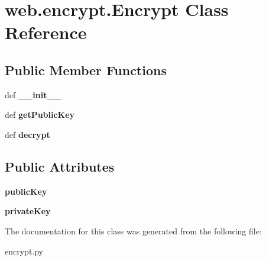 \hypertarget{classweb_1_1encrypt_1_1_encrypt}{\section{web.\-encrypt.\-Encrypt Class Reference}
\label{classweb_1_1encrypt_1_1_encrypt}
}
\subsection*{Public Member Functions}
\begin{DoxyCompactItemize}
\item 
\hypertarget{classweb_1_1encrypt_1_1_encrypt_a7ac013ef450d16011e76b7af95c25f3d}{def {\bfseries \-\_\-\-\_\-init\-\_\-\-\_\-}}\label{classweb_1_1encrypt_1_1_encrypt_a7ac013ef450d16011e76b7af95c25f3d}

\item 
\hypertarget{classweb_1_1encrypt_1_1_encrypt_ad9c50ce7eec9117081e4d86a9bfd87c9}{def {\bfseries get\-Public\-Key}}\label{classweb_1_1encrypt_1_1_encrypt_ad9c50ce7eec9117081e4d86a9bfd87c9}

\item 
\hypertarget{classweb_1_1encrypt_1_1_encrypt_afcab4d2eea9fe8213086a46253e72316}{def {\bfseries decrypt}}\label{classweb_1_1encrypt_1_1_encrypt_afcab4d2eea9fe8213086a46253e72316}

\end{DoxyCompactItemize}
\subsection*{Public Attributes}
\begin{DoxyCompactItemize}
\item 
\hypertarget{classweb_1_1encrypt_1_1_encrypt_a1e54531b2aac210260199608edc7f62c}{{\bfseries public\-Key}}\label{classweb_1_1encrypt_1_1_encrypt_a1e54531b2aac210260199608edc7f62c}

\item 
\hypertarget{classweb_1_1encrypt_1_1_encrypt_a1145a5b40bf2a2ff38383b34d4d86dc8}{{\bfseries private\-Key}}\label{classweb_1_1encrypt_1_1_encrypt_a1145a5b40bf2a2ff38383b34d4d86dc8}

\end{DoxyCompactItemize}


The documentation for this class was generated from the following file\-:\begin{DoxyCompactItemize}
\item 
encrypt.\-py\end{DoxyCompactItemize}
